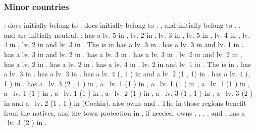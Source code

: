\subsubsection{Minor countries}
\aparag[Provinces]:
\bparag \provinceTrentino does initially belong to \paysHabsbourg.
\bparag \provinceBresse does initially belong to \paysSavoie.
\bparag \provinceGotland, \provinceVastergotland and \provinceSkane initially
belong to \paysdanemark.
\bparag \provinceMontenegro, \provinceSerbia and \provinceBosna are initially
neutral.
:
\bparag \paysHollande has a \TradeFLEET lv. 5 in , lv. 2 in
, lv. 3 in , lv. 5 in , lv. 4 in
, lv. 4 in , lv. 2 in  and lv. 3 in
. The  is in \provinceVlaanderen
\bparag \paysecosse has a \TradeFLEET lv. 3 in .
\bparag \paysdanemark has a \TradeFLEET lv. 3 in  and lv. 1 in
.
\bparag \payshanse has a \TradeFLEET lv. 3 in  and lv. 2 in
.
\bparag \payssuede has a \TradeFLEET lv. 3 in .
\bparag \paysgenes has a \TradeFLEET lv. 3 in , lv. 2 in
 and lv. 2 in .
\bparag \paysoman has a \TradeFLEET lv. 2 in .
\bparag \paysaden has a \TradeFLEET lv. 2 in .
\bparag \paysgujarat has a \TradeFLEET lv. 4 in , lv. 2 in
 and lv. 1 in . The  is in \villeDiu.
\bparag \paysjapon has a \TradeFLEET lv. 3 in .
\bparag \payschine has a \TradeFLEET lv. 3 in .
\aparag[\ROTW]
\bparag \paysOman has a \COL lv. 4 (\constructionOman, 1 ) in
 and a \TP lv. 2 (1 , 1) in
\provinceZanzibar.
\bparag \paysAden has a \COL lv. 4 (\constructionAden, 1 ) in
.
\bparag \paysgujarat has a \TP\ lv. 3 (2 , 1 ) in
\provinceDiu, a \TP\ lv. 1 (1 ) in , a \TP\ lv. 1
(1 ) in , a \TP\ lv. 1 (1 ) in
, a \TP\ lv. 1 (1 ) in , a \TP\
lv. 1 (1 ) in \provinceOrmus, a \TP\ lv. 2 (1 ) in
\provinceMumbai, a \TP\ lv. 3 (1 , 1 ) in \provinceGoa, a
\TP\ lv. 3 (2 ) in \provinceKolikot and a \TP\ lv. 2 (1 \RES{PO},
1 \RES{Spices}) in \province{Malabar S} (Cochin).
\bparag \paysgujarat also owns \granderegionMalacca and
\granderegionGujarat. The \TP in those regions benefit from the natives, and
the town protection in \provinceDiu, if needed.
\bparag \paysvijayanagar owns \granderegionOrissa, \granderegionGondwana,
\granderegionKarnatika, \granderegionMalabar, \granderegionHyderabad and
\granderegionMumbai.
\bparag \paysSiberie has a \TP\ lv. 3 (2 ) in .


